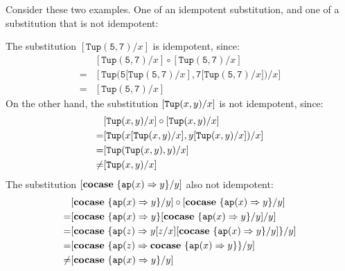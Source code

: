 \documentclass[twoside,12pt,a4paper]{article}
\begin{document}
Consider these two examples. One of an idempotent substitution, and one of a substitution that is not idempotent:
\begin{example}[Idempotency]
    The substitution $[\mathtt{Tup(5, 7)}/x]$ is idempotent, since:
    \begin{align*}
        &[\mathtt{Tup(5, 7)}/x] \circ [\mathtt{Tup(5, 7)}/x]\\
        =& [\mathtt{Tup(5[Tup(5, 7)}/x], \mathtt{7[Tup(5, 7)}/x])/x]\\
        =& [\mathtt{Tup(5, 7)}/x]
    \end{align*}
    On the other hand, the substitution $[\mathtt{Tup(}x, y\mathtt{)}/x]$ is not idempotent, since:
    \begin{align*}
        &[\mathtt{Tup(}x, y\mathtt{)}/x]\circ [\mathtt{Tup(}x, y\mathtt{)}/x]\\
        =& [\mathtt{Tup(}x[\mathtt{Tup(}x, y\mathtt{)}/x], y[\mathtt{Tup(}x, y\mathtt{)}/x]\mathtt{)}/x]\\
        =& [\mathtt{Tup(}\mathtt{Tup(}x, y\mathtt{)}, y\mathtt{)}/x]\\
        \neq& [\mathtt{Tup(}x, y\mathtt{)}/x]
    \end{align*}
    The substitution $[\textbf{cocase}\ \{\texttt{ap}(x)\Rightarrow y\}/y]$ also not idempotent:
    \begin{align*}
        &[\textbf{cocase}\ \{\texttt{ap}(x)\Rightarrow y\}/y] \circ [\textbf{cocase}\ \{\texttt{ap}(x)\Rightarrow y\}/y]\\
        =& [\textbf{cocase}\ \{\texttt{ap}(x)\Rightarrow y\}[\textbf{cocase}\ \{\texttt{ap}(x)\Rightarrow y\}/y]/y]\\
        =& [\textbf{cocase}\ \{\texttt{ap}(z)\Rightarrow y[z/x][\textbf{cocase}\ \{\texttt{ap}(x)\Rightarrow y\}/y]\}/y]\\
        =& [\textbf{cocase}\ \{\texttt{ap}(z)\Rightarrow \textbf{cocase}\ \{\texttt{ap}(x)\Rightarrow y\}\}/y]\\
        \neq & [\textbf{cocase}\ \{\texttt{ap}(x)\Rightarrow y\}/y]
    \end{align*}
\end{example}
\end{document}
